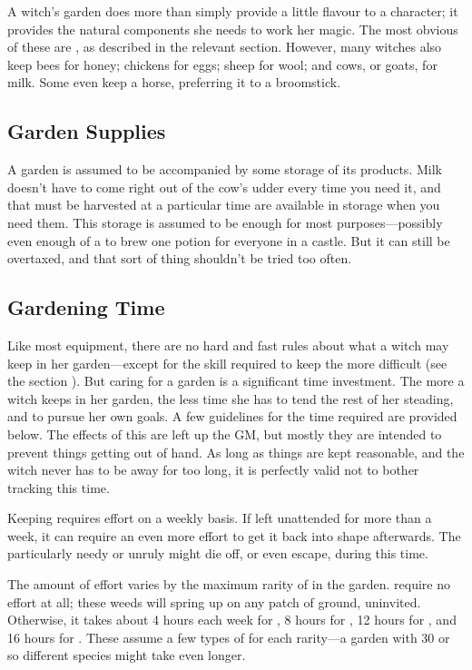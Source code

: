 A witch's garden does more than simply provide a little flavour to a character; it provides the natural components she needs to work her magic.
The most obvious of these are , as described in the relevant section.
However, many witches also keep bees for honey; chickens for eggs; sheep for wool; and cows, or goats, for milk.
Some even keep a horse, preferring it to a broomstick.

\subsection{Garden Supplies}

A garden is assumed to be accompanied by some storage of its products.
Milk doesn't have to come right out of the cow's udder every time you need it, and  that must be harvested at a particular time are available in storage when you need them.
This storage is assumed to be enough for most purposes---possibly even enough of a  to brew one potion for everyone in a castle.
But it can still be overtaxed, and that sort of thing shouldn't be tried too often.

\subsection{Gardening Time}

Like most equipment, there are no hard and fast rules about what a witch may keep in her garden---except for the  skill required to keep the more difficult  (see the section ).
But caring for a garden is a significant time investment.
The more a witch keeps in her garden, the less time she has to tend the rest of her steading, and to pursue her own goals.
A few guidelines for the time required are provided below.
The effects of this are left up the GM, but mostly they are intended to prevent things getting out of hand.
As long as things are kept reasonable, and the witch never has to be away for too long, it is perfectly valid not to bother tracking this time.

Keeping  requires effort on a weekly basis.
If left unattended for more than a week, it can require an even more effort to get it back into shape afterwards.
The particularly needy or unruly  might die off, or even escape, during this time.

The amount of effort varies by the maximum rarity of  in the garden.
 require no effort at all; these weeds will spring up on any patch of ground, uninvited.
Otherwise, it takes about 4 hours each week for , 8 hours for , 12 hours for , and 16 hours for .
These assume a few types of  for each rarity---a garden with 30 or so different species might take even longer.

